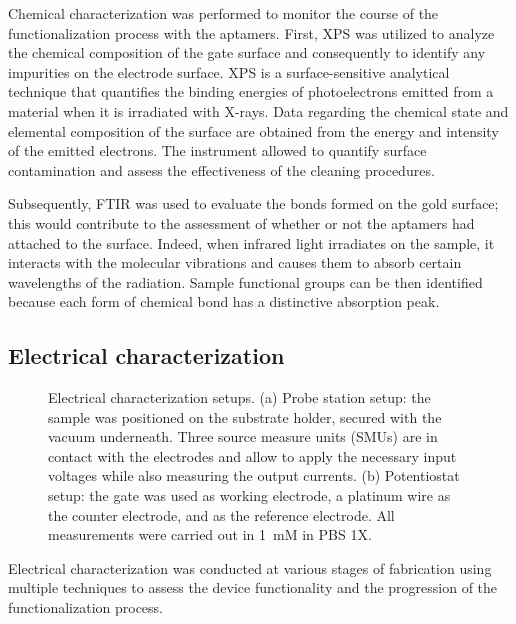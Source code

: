 Chemical characterization was performed to monitor the course of the functionalization process with the aptamers. First, XPS was utilized to analyze the chemical composition of the gate surface and consequently to identify any impurities on the electrode surface. XPS is a surface-sensitive analytical technique that quantifies the binding energies of photoelectrons emitted from a material when it is irradiated with X-rays. Data regarding the chemical state and elemental composition of the surface are obtained from the energy and intensity of the emitted electrons. The instrument allowed to quantify surface contamination and assess the effectiveness of the cleaning procedures.

Subsequently, FTIR was used to evaluate the bonds formed on the gold surface; this would contribute to the assessment of whether or not the aptamers had attached to the surface. Indeed, when infrared light irradiates on the sample, it interacts with the molecular vibrations and causes them to absorb certain wavelengths of the radiation. Sample functional groups can be then identified because each form of chemical bond has a distinctive absorption peak.

\subsection{Electrical characterization}
\label{sec:ElCharacterization}

\begin{figure}
    \centering
     \quad
    \caption{Electrical characterization setups.
    (a) Probe station setup: the sample was positioned on the substrate holder, secured with the vacuum underneath. Three source measure units (SMUs) are in contact with the electrodes and allow to apply the necessary input voltages while also measuring the output currents.
    (b) Potentiostat setup: the gate was used as working electrode, a platinum wire as the counter electrode, and  as the reference electrode. All measurements were carried out in \SI{1}{mM}  in PBS 1X.}
    \label{fig:electricalCharacterization}
\end{figure}

Electrical characterization was conducted at various stages of fabrication using multiple techniques to assess the device functionality and the progression of the functionalization process.


